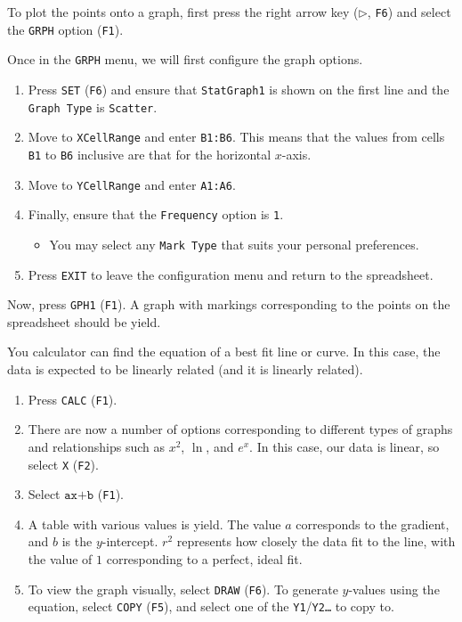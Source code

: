 \documentclass[a5paper,draft]{memoir}
\def\code#1{\texttt{#1}}
\begin{document}
To plot the points onto a graph, first press the right arrow key ($\triangleright$, \code{F6}) and select the \code{GRPH} option (\code{F1}).

Once in the \code{GRPH} menu, we will first configure the graph options. 
\begin{enumerate}
	\item Press \code{SET} (\code{F6}) and ensure that \code{StatGraph1} is shown on the first line and the \code{Graph Type} is \code{Scatter}.
	\item Move to \code{XCellRange} and enter \code{B1:B6}. This means that the values from cells \code{B1} to \code{B6} inclusive are that for the horizontal $x$-axis.
	\item Move to \code{YCellRange} and enter \code{A1:A6}.
	\item Finally, ensure that the \code{Frequency} option is \code{1}.
	\begin{itemize}
		\item You may select any \code{Mark Type} that suits your personal preferences.
	\end{itemize}
	\item Press \code{EXIT} to leave the configuration menu and return to the spreadsheet.
\end{enumerate}

Now, press \code{GPH1} (\code{F1}). A graph with markings corresponding to the points on the spreadsheet should be yield.

You calculator can find the equation of a best fit line or curve. In this case, the data is expected to be linearly related (and it is linearly related).

\begin{enumerate}
	\item Press \code{CALC} (\code{F1}).
	\item There are now a number of options corresponding to different types of graphs and relationships such as $x^2$, $\ln$, and $e^x$. In this case, our data is linear, so select \code{X} (\code{F2}).
	\item Select $\code{ax+b}$ (\code{F1}).
	\item A table with various values is yield. The value $a$ corresponds to the gradient, and $b$ is the $y$-intercept. $r^2$ represents how closely the data fit to the line, with the value of $1$ corresponding to a perfect, ideal fit.
	\item To view the graph visually, select \code{DRAW} (\code{F6}). To generate $y$-values using the equation, select \code{COPY} (\code{F5}), and select one of the \code{Y1}/\code{Y2\dots} to copy to.
\end{enumerate}
\end{document}
